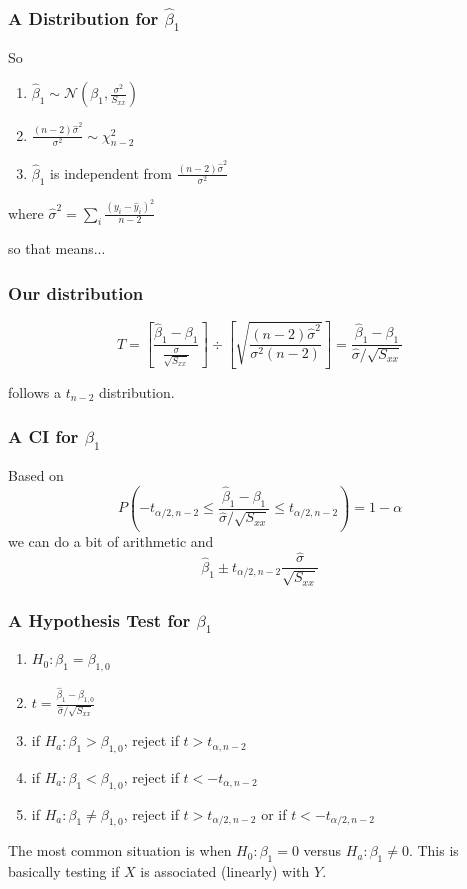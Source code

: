 \documentclass{beamer}
\begin{document}
\begin{frame}
\frametitle{A Distribution for $\hat{\beta}_1$}

So 
\begin{enumerate}
\item $\hat{\beta}_1 \sim \mathcal{N}(\beta_1, \frac{\sigma^2}{S_{xx}})$
\item $\frac{(n-2) \hat{\sigma}^2}{\sigma^2} \sim \chi^2_{n-2}$
\item $\hat{\beta}_1$ is independent from $\frac{(n-2) \hat{\sigma}^2}{\sigma^2}$
\end{enumerate}

where $\hat{\sigma}^2 = \sum_i\frac{(y_i - \hat{y}_i)^2}{n-2}$
\newline


so that means...
\end{frame}
\begin{frame}
\frametitle{Our distribution}

\[
T = \left[ \frac{\hat{\beta}_1 - \beta_1}{\frac{\sigma}{\sqrt{S_{xx}} }}\right] \div \left[\sqrt{\frac{(n-2) \hat{\sigma}^2}{\sigma^2 (n-2)} }\right] = \frac{\hat{\beta}_1 - \beta_1}{\hat{\sigma} / \sqrt{S_{xx}}}
\]

follows a $t_{n-2}$ distribution.
\end{frame}
\begin{frame}
\frametitle{A CI for $\beta_1$}

Based on
\[
P\left( - t_{\alpha/2,n-2} \le \frac{\hat{\beta}_1 - \beta_1}{\hat{\sigma} / \sqrt{S_{xx}}} \le t_{\alpha/2,n-2} \right) = 1-\alpha
\]
we can do a bit of arithmetic and 
\[
\hat{\beta}_1 \pm t_{\alpha/2,n-2} \frac{\hat{\sigma} }{ \sqrt{S_{xx}}}
\]
\end{frame}
\begin{frame}
\frametitle{A Hypothesis Test for $\beta_1$}

\begin{enumerate}
\item $H_0: \beta_1 = \beta_{1,0}$
\item $t = \frac{\hat{\beta}_1 - \beta_{1,0} }{\hat{\sigma} / \sqrt{S_{xx}}}$
\item if $H_a: \beta_1 > \beta_{1,0}$, reject if $t > t_{\alpha,n-2}$
\item if $H_a: \beta_1 < \beta_{1,0}$, reject if $t < -t_{\alpha,n-2}$
\item if $H_a: \beta_1 \neq \beta_{1,0}$, reject if $t > t_{\alpha/2,n-2}$ or if $t < -t_{\alpha/2,n-2}$
\end{enumerate}




The most common situation is when $H_0:\beta_1 = 0$ versus $H_a: \beta_1 \neq 0$. This is basically testing if $X$ is associated (linearly) with $Y$.

\end{frame}
\end{document}
